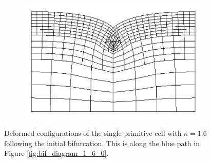 \documentclass[11pt]{report}
\begin{document}
\begin{figure}[!htb]
\begin{subfigure}[b]{0.33\textwidth}
	\end{subfigure}
    \begin{subfigure}[b]{0.33\textwidth}
		\includegraphics[width=\textwidth]{mesh/mesh_1_6_1_high}
	\end{subfigure}
	\captionsetup{format=hang}
	\caption{Deformed configurations of the single primitive cell with $\kappa = 1.6$ following the initial bifurcation. This is along the blue path in Figure \ref{fig:bif_diagram_1_6_0}.}
    \label{fig:mesh_1_6_1}
\end{figure}
\end{document}
